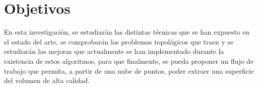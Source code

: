 \section{Objetivos}
\label{ch:objetivos}

En esta investigación, se estudiarán las distintas técnicas que se han expuesto en el estado del arte, 
se comprobarán los problemas topológicos que traen y se estudiarán las mejoras que actualmente 
se han implementado durante la existencia de estos algoritmos, para que finalmente, se pueda 
proponer un flujo de trabajo que permita, a partir de una nube de puntos, poder extraer una 
superficie del volumen de alta calidad.
